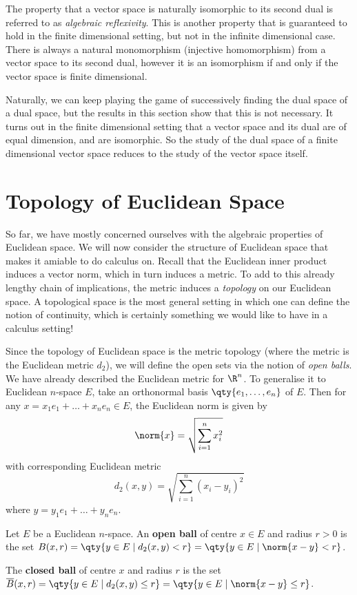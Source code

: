 The property that a vector space is naturally isomorphic to its second dual is referred to as \emph{algebraic reflexivity}. This is another property that is guaranteed to hold in the finite dimensional setting, but not in the infinite dimensional case. There is always a natural monomorphism (injective homomorphism) from a vector space to its second dual, however it is an isomorphism if and only if the vector space is finite dimensional.

\vspace{3mm}

Naturally, we can keep playing the game of successively finding the dual space of a dual space, but the results in this section show that this is not necessary. It turns out in the finite dimensional setting that a vector space and its dual are of equal dimension, and are isomorphic. So the study of the dual space of a finite dimensional vector space reduces to the study of the vector space itself.

\section{Topology of Euclidean Space}
So far, we have mostly concerned ourselves with the algebraic properties of Euclidean space. We will now consider the structure of Euclidean space that makes it amiable to do calculus on. Recall that the Euclidean inner product induces a vector norm, which in turn induces a metric. To add to this already lengthy chain of implications, the metric induces a \emph{topology} on our Euclidean space. A topological space is the most general setting in which one can define the notion of continuity, which is certainly something we would like to have in a calculus setting!

\vspace{3mm}

Since the topology of Euclidean space is the metric topology (where the metric is the Euclidean metric \( d_2 \)), we will define the open sets via the notion of \emph{open balls}. We have already described the Euclidean metric for \( \R^n \). To generalise it to Euclidean \( n \)-space \( E \), take an orthonormal basis \( \qty{e_1,\dots,e_n} \) of \( E \). Then for any \( x=x_1e_1+\dots+x_ne_n\in E \), the Euclidean norm is given by
\[ \norm{x}=\sqrt{\sum_{i=1}^nx_i^2} \]
with corresponding Euclidean metric
\[ d_2(x,y)=\sqrt{\sum_{i=1}^n(x_i-y_i)^2} \]
where \( y=y_1e_1+\dots+y_ne_n \).

\begin{definition}
  Let \( E \) be a Euclidean \( n \)-space. An \textbf{open ball} of centre \( x\in E \) and radius \( r>0 \) is the set \( B(x,r)=\qty{y\in E\mid d_2(x,y)<r}=\qty{y\in E\mid \norm{x-y}<r} \).

  \vspace{3mm}

  The \textbf{closed ball} of centre \( x \) and radius \( r \) is the set \( \overline{B}(x,r)=\qty{y\in E\mid d_2(x,y)\leq r}=\qty{y\in E\mid \norm{x-y}\leq r} \).
\end{definition}

